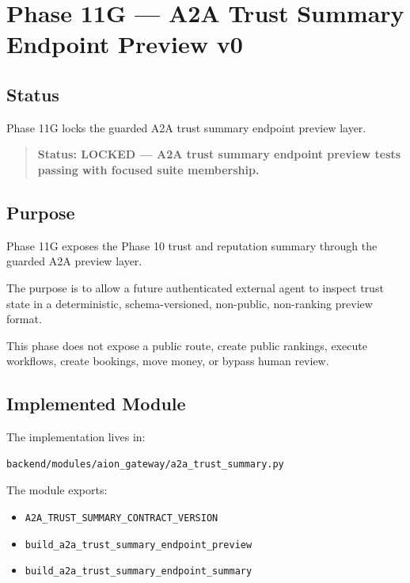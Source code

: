 \section{Phase 11G --- A2A Trust Summary Endpoint Preview v0}
\label{sec:aion-a2a-trust-summary-endpoint-preview-v0}

\subsection{Status}

Phase 11G locks the guarded A2A trust summary endpoint preview layer.

\begin{quote}
\textbf{Status: LOCKED --- A2A trust summary endpoint preview tests passing with focused suite membership.}
\end{quote}

\subsection{Purpose}

Phase 11G exposes the Phase 10 trust and reputation summary through the guarded A2A preview layer.

The purpose is to allow a future authenticated external agent to inspect trust state in a deterministic, schema-versioned, non-public, non-ranking preview format.

This phase does not expose a public route, create public rankings, execute workflows, create bookings, move money, or bypass human review.

\subsection{Implemented Module}

The implementation lives in:

\begin{verbatim}
backend/modules/aion_gateway/a2a_trust_summary.py
\end{verbatim}

The module exports:

\begin{itemize}
  \item \texttt{A2A\_TRUST\_SUMMARY\_CONTRACT\_VERSION}
  \item \texttt{build\_a2a\_trust\_summary\_endpoint\_preview}
  \item \texttt{build\_a2a\_trust\_summary\_endpoint\_summary}
\end{itemize}

